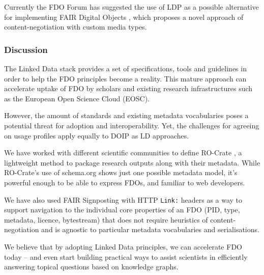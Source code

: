 Currently the FDO Forum has suggested the use of LDP as a possible
alternative for implementing FAIR Digital Objects \cite{bonino2021}, which
proposes a novel approach of content-negotiation with custom media
types.

\subsubsection{Discussion}\label{ch2:discussion}

The Linked Data stack provides a set of specifications, tools and
guidelines in order to help the FDO principles become a reality. This
mature approach can accelerate uptake of FDO by scholars and existing
research infrastructures such as the European Open Science Cloud (EOSC).

However, the amount of standards and existing metadata vocabularies
poses a potential threat for adoption and interoperability. Yet, the
challenges for agreeing on usage profiles apply equally to DOIP as LD
approaches.

We have worked with different scientific communities to define 
RO-Crate \cite{Soiland-Reyes 2022}, a
lightweight method to package research outputs along with their
metadata. While RO-Crate's use of schema.org shows just one possible
metadata model, it's powerful enough to be able to express FDOs, and
familiar to web developers.

We have also used FAIR Signposting \cite{Van de Sompel 2022} with HTTP
\texttt{Link:} headers as a way to support navigation to the individual
core properties of an FDO (PID, type, metadata, licence, bytestream)
that does not require heuristics of content-negotiation and is agnostic
to particular metadata vocabularies and serialisations.

We believe that by adopting Linked Data principles, we can accelerate
FDO today -- and even start building practical ways to assist scientists
in efficiently answering topical questions based on knowledge graphs.

